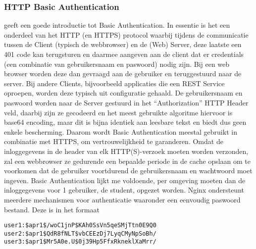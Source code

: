 \subsubsection{HTTP Basic Authentication}
\textcite{Mozilla2023} geeft een goede introductie tot Basic Authentication.
In essentie is het een onderdeel van het HTTP (en HTTPS) protocol waarbij tijdens de communicatie tussen de Client (typisch de webbrowser) en de (Web) Server, deze laatste een 401 code kan terugsturen en daarmee aangeven aan de client dat er credentials (een combinatie van gebruikersnaam en paswoord) nodig zijn. Bij een web browser worden deze dan gevraagd aan de gebruiker en teruggestuurd naar de server. Bij andere Clients, bijvoorbeeld applicaties die een REST Service oproepen, worden deze typisch uit configuratie gehaald.
De gebruikersnaam en paswoord worden naar de Server gestuurd in het ``Authorization'' HTTP Header veld, daarbij zijn ze gecodeerd en het meest gebruikte algoritme hiervoor is base64 encoding, maar dit is bijna identiek aan leesbare tekst en biedt dus geen enkele bescherming. Daarom wordt Basic Authentication meestal gebruikt in combinatie met HTTPS, om vertrouwelijkheid te garanderen.
\newline
Omdat de inloggegevens in de header van elk HTTP(S)-verzoek moeten worden verzonden, zal een webbrowser ze gedurende een bepaalde periode in de cache opslaan om te voorkomen dat de gebruiker voortdurend de gebruikersnaam en wachtwoord moet ingeven.
\newline
\newline
Basic Authentication lijkt me voldoende, per omgeving moeten dan de inloggegevens voor 1 gebruiker, de student, opgezet worden. Nginx ondersteunt meerdere mechanismen voor authenticatie waaronder een eenvoudig paswoord bestand. Deze is in het formaat
\newline
\newline
\begin{lstlisting}
user1:$apr1$/woC1jnP$KAh0SsVn5qeSMjTtn0E9Q0
user2:$apr1$QdR8fNLT$vbCEEzDj7LyqCMyNpSoBh/
user3:$apr1$Mr5A0e.U$0j39Hp5FfxRkneklXaMrr/ 
\end{lstlisting}


